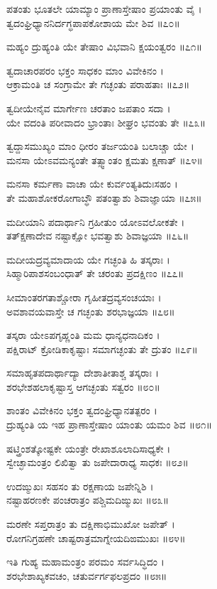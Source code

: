 ಪತಂತು ಭೂತಲೇ ಯಾಮ್ಯಾಂ ಪ್ರಾಣಾಸ್ತೇಷಾಂ ಪ್ರಯಾಂತು ವೈ ।\\
ತ್ವದಂಘ್ರಿಧ್ಯಾನನಿರ್ದಗ್ಧಪಾಪಕೋಶಾಯ ಮೇ ಶಿವ ॥೭೦॥

ಮಹ್ಯಂ ದ್ರುಹ್ಯಂತಿ ಯೇ ತೇಷಾಂ ವಿಭವಾನಿ ಕ್ಷಯಂತ್ವರಂ ॥೭೧॥

ತ್ವದಾಚಾರಪರಂ ಭಕ್ತಂ ಸಾಧಕಂ ಮಾಂ ವಿವೇಕಿನಂ ।\\
ಆಕ್ರಾಮಂತಿ ಚ ಸಂಗ್ರಾಮೇ ತೇ ಗಚ್ಛಂತು ಪರಾಹತಾಃ ॥೭೨॥

ತ್ವದೀಯೇನೈವ ಮಾರ್ಗೇಣ ಚರತಾಂ ಜಪತಾಂ ಸದಾ ।\\
ಯೇ ವದಂತಿ ಪರೀವಾದಂ ಭ್ರಾಂತಾಃ ಶೀಘ್ರಂ ಭವಂತು ತೇ ॥೭೩॥

ತ್ವದ್ದಾಸಮುಖ್ಯಂ ಮಾಂ ಧೀರಂ ತರ್ಜಯಂತಿ ಬಲಾಚ್ಚಾ ಯೇ ।\\
ಮನಸಾ ಯೇಽವಮನ್ಯಂತೇ ತತ್ಸ್ವಾಂತಂ ಕ್ಷಮತು ಕ್ಷಣಾತ್ ॥೭೪॥

ಮನಸಾ ಕರ್ಮಣಾ ವಾಚಾ ಯೇ ಕುರ್ವಂತ್ಯತಿದುಃಸಹಂ ।\\
ತೇ ಮಹಾಶೋಕರೋಗಾಬ್ಧೌ ಪತಂತ್ವಾಶು ಶಿವಾಜ್ಞಾಯಾ ॥೭೫॥

ಮದೀಯಾನಿ ಪದಾರ್ಥಾನಿ ಗ್ರಹೀತುಂ ಯೋಽವಲೋಕತೇ ।\\
ತತ್ಕ್ಷಣಾದೇವ ನಷ್ಟಾಕ್ಷೋ ಭವತ್ವಾಶು ಶಿವಾಜ್ಞಯಾ ॥೭೬॥

ಮದೀಯದ್ರವ್ಯಮಾದಾಯ ಯೇ ಗಚ್ಛಂತಿ ಹಿ ತಸ್ಕರಾಃ ।\\
ಸಿಹ್ಮಾರಿಪಾಶಸಂಬಂಧಾತ್ ತೇ ಚರಂತು ಪ್ರದಕ್ಷಿಣಂ ॥೭೭॥

ಸೀಮಾಂತರಗತಾಶ್ಚೋರಾ ಗೃಹೀತದ್ರವ್ಯಸಂಚಯಾಃ ।\\
ಅವಶಾವಯವಾಸ್ತೇ ಚ ಗಚ್ಛಂತು ಶರಭಾಜ್ಞಯಾ ॥೭೮॥

ತಸ್ಕರಾ ಯೇಽಪಗೃಹ್ಣಂತಿ ಮಮ ಧಾನ್ಯಧನಾದಿಕಂ ।\\
ಪಕ್ಷಿರಾಟ್ ಕ್ರೋಡಿಕಾಕೃಷ್ಟಾಃ ಸಮಾಗಚ್ಛಂತು ತೇ ದ್ರುತಂ ॥೭೯॥

ಸಮಾಹೃತಪದಾರ್ಥಾದ್ಯಾ ದೇಶಾತೀತಾಶ್ಚ ತಸ್ಕರಾಃ ।\\
ಶರಭೇಶಹಲಾಕೃಷ್ಟಾಸ್ತ ಆಗಚ್ಛಂತು ಸತ್ವರಂ ॥೮೦॥

ಶಾಂತಂ ವಿವೇಕಿನಂ ಭಕ್ತಂ ತ್ವದಂಘ್ರಿಧ್ಯಾನತತ್ಪರಂ ।\\
ದ್ರುಹ್ಯಂತಿ ಯ ಇಹ ಪ್ರಾಣಾಸ್ತೇಷಾಂ ಯಾಂತು ಯಮಂ ಶಿವ ॥೮೧॥

ಷಟ್ತ್ರಿಂಶತ್ಕೋಷ್ಟಕೇ ಯಂತ್ರೇ ರೇಖಾಶೂಲಾದಿಸಾಧ್ಯಕೇ ।\\
ಸ್ವೇಚ್ಛಾಮಂತ್ರಂ ಲಿಖಿತ್ವಾ ತು ಜಪೇದಾರಾಧ್ಯ ಸಾಧಕಃ ॥೮೨॥

ಉದಙ್ಮುಖಃ ಸಹಸಂ ತು ರಕ್ಷಣಾಯ ಜಪೇನ್ನಿಶಿ ।\\
ನಷ್ಟಾಹರಣಕೇ ಪಂಚರಾತ್ರಂ ಪಶ್ಚಿಮದಿಙ್ಮುಖಃ ॥೮೩॥

ಮರಣೇ ಸಪ್ತರಾತ್ರಂ ತು ದಕ್ಷಿಣಾಭಿಮುಖೋ ಜಪೇತ್ ।\\
ರೋಗನಿಗ್ರಹಣೇ ಚಾಷ್ಟರಾತ್ರಮಾಗ್ನೇಯದಿಙಮುಖಃ ॥೮೪॥

ಇತಿ ಗುಹ್ಯ ಮಹಾಮಂತ್ರಂ ಪರಮಂ ಸರ್ವಸಿದ್ಧಿದಂ ।\\
ಶರಭೇಶಾಖ್ಯಕವಚಂ, ಚತುರ್ವರ್ಗಫಲಪ್ರದಂ ॥೮೫॥

